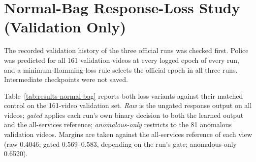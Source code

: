 \section{Normal-Bag Response-Loss Study (Validation Only)}
\label{sec:results-normal-bag}

The recorded validation history of the three official runs was checked first.
Police was predicted for all 161 validation videos at every logged epoch of
every run, and a minimum-Hamming-loss rule selects the official epoch in all
three runs. Intermediate checkpoints were not saved.

Table~\ref{tab:results-normal-bag} reports both loss variants against their
matched control on the 161-video validation set. \emph{Raw} is the ungated
response output on all videos; \emph{gated} applies each run's own binary
decision to both the learned output and the all-services reference;
\emph{anomalous-only} restricts to the 81 anomalous validation videos. Margins
are taken against the all-services reference of each view (raw 0.4046; gated
0.569--0.583, depending on the run's gate; anomalous-only 0.6520).

